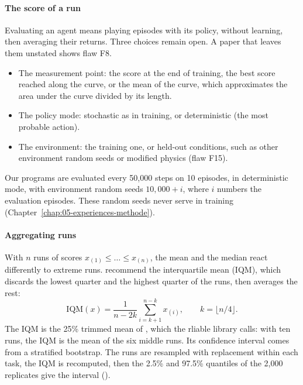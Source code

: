 \paragraph{The score of a run}
Evaluating an agent means playing episodes with its policy, without learning, then averaging their
returns. Three choices remain open. A paper that leaves them unstated shows flaw F8.
\begin{itemize}
  \item The measurement point: the score at the end of training, the best score reached along the
  curve, or the mean of the curve, which approximates the area under the curve divided by its length.
  \item The policy mode: stochastic as in training, or deterministic (the most probable action).
  \item The environment: the training one, or held-out conditions, such as other environment random
  seeds or modified physics (flaw F15).
\end{itemize}
Our programs are evaluated every 50,000 steps on 10 episodes, in deterministic mode, with
environment random seeds $10{,}000 + i$, where $i$ numbers the evaluation episodes. These random
seeds never serve in training (Chapter~\ref{chap:05-experiences-methode}).

\paragraph{Aggregating runs}
With $n$ runs of scores $x_{(1)} \leq \dots \leq x_{(n)}$, the mean and the median react differently to
extreme runs. \textcite{agarwal2021precipice} recommend the interquartile mean (IQM), which discards
the lowest quarter and the highest quarter of the runs, then averages the rest:
\begin{equation}
  \mathrm{IQM}(x) = \frac{1}{n - 2k} \sum_{i = k + 1}^{n - k} x_{(i)}, \qquad k = \lfloor n/4 \rfloor .
\end{equation}
The IQM is the 25\% trimmed mean of , which the rliable library calls:
with ten runs, the IQM is the mean of the six middle runs. Its confidence interval comes from a
stratified bootstrap. The runs are resampled with replacement within each task, the IQM is
recomputed, then the 2.5\% and 97.5\% quantiles of the 2,000 replicates give the interval
().

